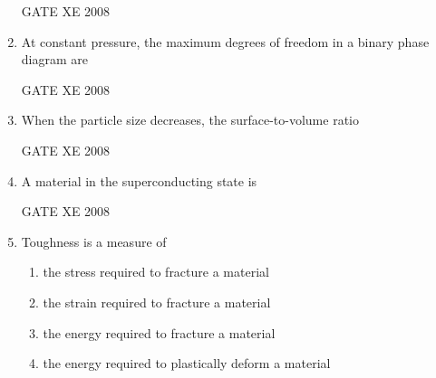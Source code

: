 \documentclass[12pt]{article}
\begin{document}
\begin{enumerate}[label=Q\arabic*.]
    GATE XE 2008  
\item At constant pressure, the maximum degrees of freedom in a binary phase diagram are  

\begin{enumerate}[label=(\Alph*)]
\end{enumerate}

    GATE XE 2008  
\item When the particle size decreases, the surface-to-volume ratio  

\begin{enumerate}[label=(\Alph*)]
\end{enumerate}

    GATE XE 2008  
\item A material in the superconducting state is  

\begin{enumerate}[label=(\Alph*)]
\end{enumerate}

    GATE XE 2008  
\item Toughness is a measure of  

\begin{enumerate}[label=(\Alph*)]
\item  the stress required to fracture a material  
\item  the strain required to fracture a material 
\item  the energy required to fracture a material 
\item  the energy required to plastically deform a material 
\end{enumerate}


\end{enumerate}
\end{document}
